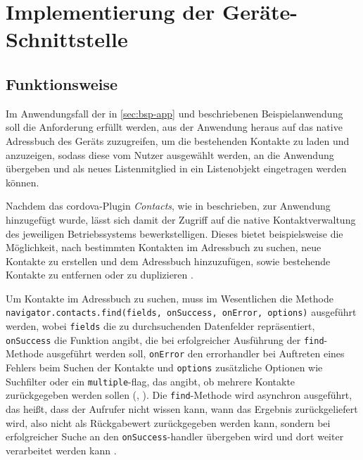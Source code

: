 \chapter{Implementierung der Geräte-Schnittstelle}	\label{sec:impl}

		

\section{Funktionsweise}

Im Anwendungsfall  der in \autoref{sec:bsp-app} und  beschriebenen Beispielanwendung soll die Anforderung erfüllt werden, aus der Anwendung heraus auf das native Adressbuch des Geräts zuzugreifen, um die bestehenden Kontakte zu laden und anzuzeigen, sodass diese vom Nutzer ausgewählt werden, an die Anwendung übergeben und als neues Listenmitglied in ein Listenobjekt eingetragen werden können.

Nachdem das \gls{cordova}-Plugin \emph{Contacts}, wie in  beschrieben, zur Anwendung hinzugefügt wurde, lässt sich damit der Zugriff auf die native Kontaktverwaltung des jeweiligen Betriebssystems bewerkstelligen.
Dieses bietet beispielsweise die Möglichkeit, nach bestimmten Kontakten im Adressbuch zu suchen, neue Kontakte zu erstellen und dem Adressbuch hinzuzufügen, sowie bestehende Kontakte zu entfernen oder zu duplizieren \cite{Cordova_Plugin_Registry_Contacts}.

Um Kontakte im Adressbuch zu suchen, muss im Wesentlichen die Methode \lstinline|navigator.contacts.find(fields, onSuccess, onError, options)| ausgeführt werden, wobei \lstinline|fields| die zu durchsuchenden Datenfelder repräsentiert, \lstinline|onSuccess| die Funktion angibt, die bei erfolgreicher Ausführung der \lstinline|find|-Methode ausgeführt werden soll, \lstinline|onError| den \gls{errorhandler} bei Auftreten eines Fehlers beim Suchen der Kontakte und \lstinline|options| zusätzliche Optionen wie Suchfilter oder ein \lstinline|multiple|-\gls{flag}, das angibt, ob mehrere Kontakte zurückgegeben werden sollen (, ).
Die \lstinline|find|-Methode wird \gls{asynchron} ausgeführt, das heißt, dass der Aufrufer nicht wissen kann, wann das Ergebnis zurückgeliefert wird, also nicht als Rückgabewert zurückgegeben werden kann, sondern bei erfolgreicher Suche an den \og \lstinline|onSuccess|-\gls{handler} übergeben wird und dort weiter verarbeitet werden kann \cite{Cordova_Plugin_Registry_Contacts}.

